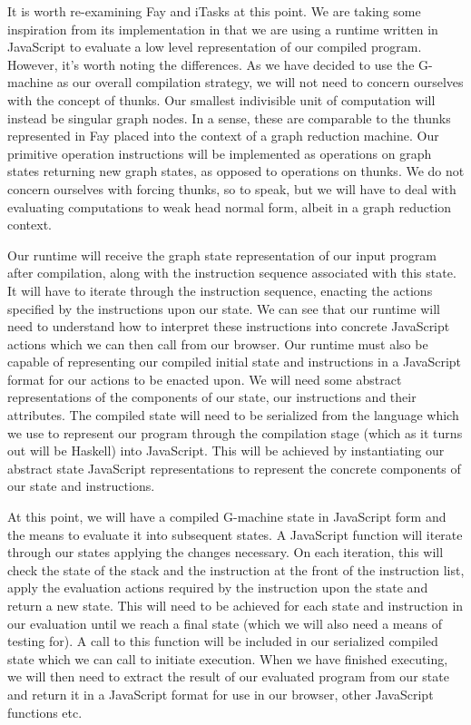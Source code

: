 It is worth re-examining Fay and iTasks at this point. We are
taking some inspiration from its implementation in
that we are using a runtime written in JavaScript to 
evaluate a low level representation of our compiled
program. However, it's worth noting the differences.
As we have decided to use the G-machine as our overall
compilation strategy, we 
will not need to concern ourselves with the
concept of thunks. Our smallest indivisible unit of
computation will instead be singular graph nodes. 
In a sense, these are comparable to the thunks
represented in Fay placed into the context of a graph
reduction machine. Our primitive operation instructions
will be implemented as operations on graph states
returning new graph states, as opposed to operations on 
thunks. We do not concern ourselves with forcing thunks, 
so to speak, but we will have to deal with evaluating 
computations to weak head normal form, albeit in a 
graph reduction context. 

Our runtime will receive the graph state representation
of our input program after compilation, along with the
instruction sequence associated with this state. It will
have to iterate through the instruction sequence, enacting
the actions specified by the instructions upon our state.
We can see that our runtime will need to understand how
to interpret these instructions into concrete JavaScript
actions which we can then call from our browser. Our 
runtime must also be capable of representing our compiled
initial state and instructions in a JavaScript format 
for our actions to be enacted upon. We will 
need some abstract representations of the components of
our state, our instructions and their attributes. The
compiled state will need to be serialized from the 
language which we use to represent our program through
the compilation stage (which as it turns out will be
Haskell) into JavaScript. This will be achieved by
instantiating our abstract state JavaScript
representations to represent the concrete components of
our state and instructions.

At this point, we will have a compiled G-machine state 
in JavaScript form and the means to evaluate it into
subsequent states. 
A JavaScript function will iterate through our states
applying the changes necessary. On each iteration, this
will check the state of the stack and
the instruction at the front of the instruction list,
apply the evaluation actions required by the instruction
upon the state and return a new state. This will need 
to be achieved for each state and instruction in our
evaluation until we reach a final state (which we will
also need a means of testing for). A call to this
function will be included in our serialized compiled
state which we can call to initiate execution.
When we have finished executing, we will then need
to extract the result of our evaluated program from
our state and return it in a JavaScript format for 
use in our browser, other JavaScript functions etc.